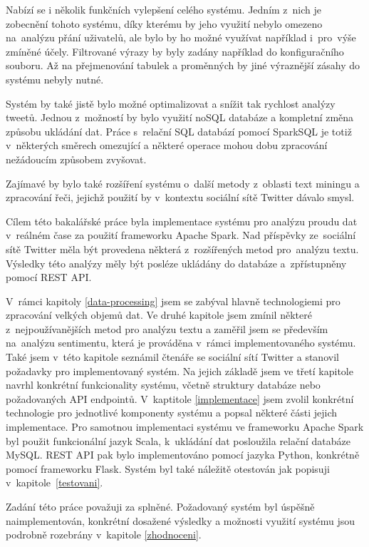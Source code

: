 \documentclass[thesis=B,czech]{FITthesis}[2012/06/26]
\begin{document}
Nabízí se i několik funkčních vylepšení celého systému. Jedním z~nich je zobecnění tohoto systému, díky kterému by jeho využití nebylo omezeno na~analýzu přání uživatelů, ale bylo by ho možné využívat například i~pro~výše zmíněné účely. Filtrované výrazy by byly zadány například do konfiguračního souboru. Až na přejmenování tabulek a proměnných by jiné výraznější zásahy do systému nebyly nutné. 

Systém by také jistě bylo možné optimalizovat a snížit tak rychlost analýzy tweetů. Jednou z~možností by bylo využití noSQL databáze a kompletní změna způsobu ukládání dat. Práce s~relační SQL databází pomocí SparkSQL je totiž v~některých směrech omezující a některé operace mohou dobu zpracování nežádoucím způsobem zvyšovat. 

Zajímavé by bylo také rozšíření systému o~další metody z~oblasti text miningu a zpracování řeči, jejichž použití by v~kontextu sociální sítě Twitter dávalo smysl. 


\begin{conclusion}
	Cílem této bakalářské práce byla implementace systému pro analýzu proudu dat v~reálném čase za použití frameworku Apache Spark. Nad příspěvky ze~sociální sítě Twitter měla být provedena některá z~rozšířených metod pro~analýzu textu. Výsledky této analýzy měly být posléze ukládány do databáze a~zpřístupněny pomocí REST API. 
	
	V~rámci kapitoly \ref{data-processing} jsem se zabýval hlavně technologiemi pro zpracování velkých objemů dat. Ve druhé kapitole jsem zmínil některé z~nejpoužívanějších metod pro analýzu textu a zaměřil jsem se především na~analýzu sentimentu, která je prováděna v~rámci implementovaného systému. Také jsem v~této kapitole seznámil čtenáře se sociální sítí Twitter a stanovil požadavky pro implementovaný systém. Na jejich základě jsem ve třetí kapitole navrhl konkrétní funkcionality systému, včetně struktury databáze nebo požadovaných API \mbox{endpointů}. V~kaptitole \ref{implementace} jsem zvolil konkrétní technologie pro jednotlivé komponenty systému a popsal některé části jejich implementace. Pro samotnou implementaci systému ve frameworku Apache Spark byl použit funkcionální  jazyk Scala, k~ukládání dat posloužila relační databáze MySQL. REST API pak bylo implementováno pomocí jazyka Python, konkrétně pomocí frameworku Flask. Systém byl také náležitě otestován jak popisuji v~kapitole~\ref{testovani}. 
	
	Zadání této práce považuji za splněné. Požadovaný systém byl úspěšně naimplementován, konkrétní dosažené výsledky a možnosti využití systému jsou podrobně rozebrány v~kapitole \ref{zhodnoceni}. 
\end{conclusion}
\end{document}
